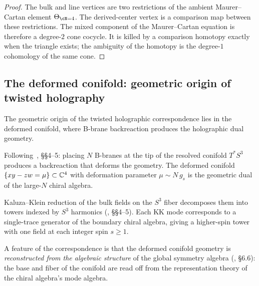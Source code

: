 \begin{proof}
The bulk and line vertices are two restrictions of the ambient Maurer--Cartan element
$\Theta_{\cN=4}$. The derived-center vertex is a comparison map between these restrictions.
The mixed component of the Maurer--Cartan equation is therefore a degree-$2$ cone cocycle.
It is killed by a comparison homotopy exactly when the triangle exists; the ambiguity of the
homotopy is the degree-$1$ cohomology of the same cone.
\end{proof}

\subsection{The deformed conifold: geometric origin of twisted holography}
\label{subsec:deformed-conifold}

The geometric origin of the twisted holographic correspondence lies in
the deformed conifold, where B-brane backreaction produces the
holographic dual geometry.

\begin{proposition}
\label{prop:b-brane-backreaction}
Following~\cite{CG18}, \S\S4--5: placing $N$ B-branes at the tip of the
resolved conifold $T^*S^3$ produces a backreaction that deforms the
geometry. The deformed conifold $\{xy - zw = \mu\} \subset \mathbb C^4$ with
deformation parameter $\mu \sim N\,g_s$ is the geometric dual of the
large-$N$ chiral algebra.
\end{proposition}

\begin{proposition}
\label{prop:kk-tower-s3}
Kaluza--Klein reduction of the bulk fields on the $S^3$ fiber
decomposes them into towers indexed by $S^3$ harmonics
\textup{(}\!\cite{CG18}, \S\S4--5\textup{)}. Each KK mode corresponds
to a single-trace generator of the boundary chiral algebra, giving a
higher-spin tower with one field at each integer spin $s \geq 1$.
\end{proposition}

\begin{remark}
\label{rem:geometry-from-algebra}
A feature of the correspondence is that the deformed conifold
geometry is \emph{reconstructed from the algebraic structure} of the
global symmetry algebra \textup{(}\!\cite{CG18}, \S6.6\textup{)}: the
base and fiber of the conifold are read off from the representation
theory of the chiral algebra's mode algebra.
\end{remark}

